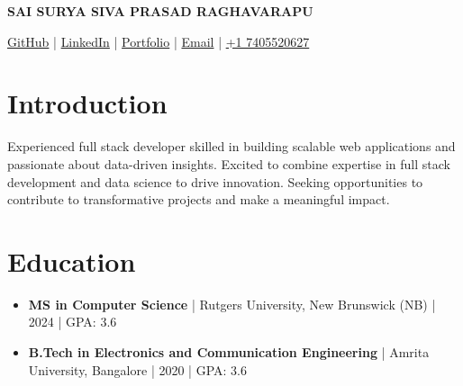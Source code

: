 \documentclass[letterpaper, 9pt]{extarticle}
\begin{document}
\begin{center}
	\textbf{{\Huge SAI SURYA SIVA PRASAD RAGHAVARAPU}}
\end{center}

\begin{center}
{\faGithub} \href{https://github.com/sai-surya-siva-prasad}{GitHub} |
{\faLinkedin} \href{https://linkedin.com/in/siyasurya}{LinkedIn} |
{\faBriefcase} \href{https://taupe-mousse-8028fd.netlify.app/}{Portfolio} |
{\faEnvelopeO} \href{mailto:suryaraghavarapu@gmail.com}{Email} |
{\faPhone} \href{tel:+17405520627}{+1 7405520627}
\end{center}

\section{Introduction}
Experienced full stack developer skilled in building scalable web applications and passionate about data-driven insights. Excited to combine expertise in full stack development and data science to drive innovation. Seeking opportunities to contribute to transformative projects and make a meaningful impact.

\section{Education}
\begin{itemize}
\item \textbf{MS in Computer Science} | Rutgers University, New Brunswick (NB) | 2024 | GPA: 3.6
\item \textbf{B.Tech in Electronics and Communication Engineering} | Amrita University, Bangalore | 2020 | GPA: 3.6
\end{itemize}
\end{document}
